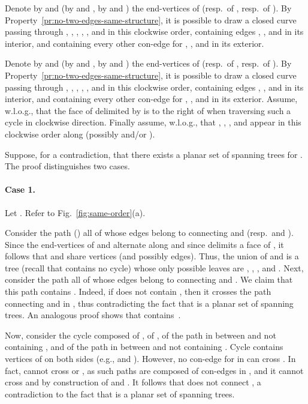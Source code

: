 \documentclass[letter,runningheads]{llncs}
\renewenvironment{proof}
{{\em Proof.\ }}{\hspace*{\fill}\par\vspace{2mm}}
\begin{document}
\begin{proof}
Denote by  and  (by  and , by  and ) the end-vertices of  (resp.\ of , resp.\ of ). By Property~\ref{pr:no-two-edges-same-structure}, it is possible to draw a closed curve  passing through , , , , , and  in this clockwise order, containing edges , , and  in its interior, and containing every other con-edge for , , and  in its exterior.

Denote by  and  (by  and , by  and ) the end-vertices of  (resp.\ of , resp.\ of ). By Property~\ref{pr:no-two-edges-same-structure}, it is possible to draw a closed curve  passing through , , , , , and  in this clockwise order, containing edges , , and  in its interior, and containing every other con-edge for , , and  in its exterior. Assume, w.l.o.g., that the face of  delimited by  is to the right of  when traversing such a cycle in clockwise direction. Finally assume, w.l.o.g., that , , , and  appear in this clockwise order along  (possibly  and/or ).

Suppose, for a contradiction, that there exists a planar set  of spanning trees for . The proof distinguishes two cases.

\paragraph{Case 1.} Let . Refer to Fig.~\ref{fig:same-order}(a).

Consider the path  () all of whose edges belong to  connecting  and  (resp.\  and ). Since the end-vertices of  and  alternate along  and since  delimits a face of , it follows that  and  share vertices (and possibly edges). Thus, the union of  and  is a tree  (recall that  contains no cycle) whose only possible leaves are , , , and . Next, consider the path  all of whose edges belong to  connecting  and . We claim that this path contains . Indeed, if  does not contain , then it crosses the path connecting  and  in , thus contradicting the fact that  is a planar set of spanning trees. An analogous proof shows that  contains~.

Now, consider the cycle  composed of , of , of the path  in  between  and  not containing , and of the path  in  between  and  not containing . Cycle  contains vertices of  on both sides (e.g.,  and ). However, no con-edge  for  in  can cross . In fact,  cannot cross  or , as such paths are composed of con-edges in , and it cannot cross  and  by construction of  and . It follows that  does not connect , a contradiction to the fact that  is a planar set of spanning trees.


\end{proof}
\end{document}
